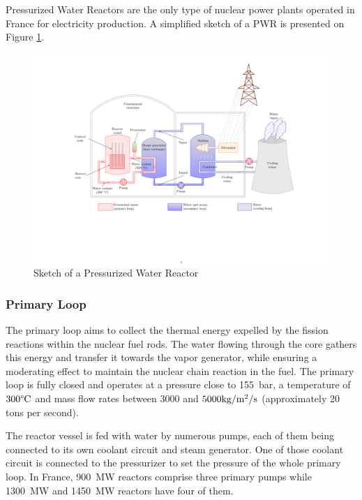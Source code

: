 Pressurized Water Reactors are the only type of nuclear power plants operated in France for electricity production. A simplified sketch of a PWR is presented on Figure \ref{fig:pwr_sketch}.

\begin{figure}[!h]
\centering
\includegraphics[width=1.0\linewidth]{img/intro/pwr_tikz.pdf}
\caption{Sketch of a Pressurized Water Reactor \cite{Gloria_Faccanoni}}
\label{fig:pwr_sketch}
\end{figure}

\npar

\subsubsection{Primary Loop}

The primary loop aims to collect the thermal energy expelled by the fission reactions within the nuclear fuel rods. The water flowing through the core gathers this energy and transfer it towards the vapor generator, while ensuring a moderating effect to maintain the nuclear chain reaction in the fuel. The primary loop is fully closed and operates at a pressure close to 155\ bar, a temperature of $300\degree\mathrm{C}$ and mass flow rates between $3000$ and $5000 \text{kg/m$^{2}$/s}$ (approximately 20 tons per second).  

\npar

The reactor vessel is fed with water by numerous pumps, each of them being connected to its own coolant circuit and steam generator. One of those coolant circuit is connected to the pressurizer to set the pressure of the whole primary loop. In France, 900~MW reactors comprise three primary pumps while 1300~MW and 1450~MW reactors have four of them.

